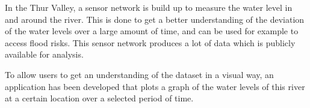 In the Thur Valley, a sensor network is build up to measure the water level in and around the river. This is done to get a better understanding of the deviation of the water levels over a large amount of time, and can be used for example to access flood risks. This sensor network produces a lot of data which is publicly available for analysis. 

To allow users to get an understanding of the dataset in a visual way, an application has been developed that plots a graph of the water levels of this river at a certain location over a selected period of time.